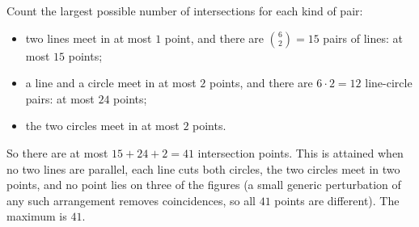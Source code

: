 Count the largest possible number of intersections for each kind of pair:
\begin{itemize}
\item two lines meet in at most $1$ point, and there are $\binom62=15$ pairs of lines: at most $15$ points;
\item a line and a circle meet in at most $2$ points, and there are $6\cdot2=12$ line-circle pairs: at most $24$ points;
\item the two circles meet in at most $2$ points.
\end{itemize}
So there are at most $15+24+2=41$ intersection points. This is attained when no two lines are parallel, each line cuts both circles, the two circles meet in two points, and no point lies on three of the figures (a small generic perturbation of any such arrangement removes coincidences, so all $41$ points are different). The maximum is $\boxed{41}$.

